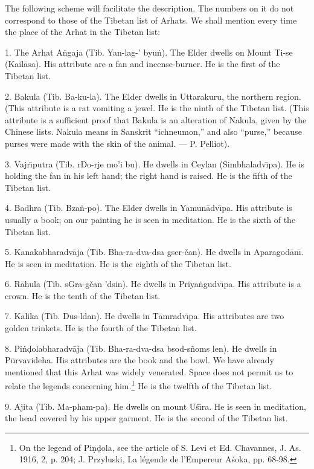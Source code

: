 \documentclass[a4paper, 12pt, oneside]{article}
\begin{document}
The following scheme will facilitate the description. The numbers on it do not correspond to those of the Tibetan list of Arhats. We shall mention every time the place of the Arhat in the Tibetan list:

1. The Arhat A\.{n}gaja (Tib. Yan-lag-' byu\.{n}). The Elder dwells on Mount Ti-se (Kail\={a}sa). His attribute are a fan and incense-burner. He is the first of the Tibetan list.

2. Bakula (Tib. Ba-ku-la). The Elder dwells in Uttarakuru, the northern region. (This attribute is a rat vomiting a jewel. He is the ninth of the Tibetan list. (This attribute is a sufficient proof that Bakula is an alteration of Nakula, given by the Chinese lists. Nakula means in Sanskrit ``ichneumon,'' and also ``purse,'' because purses were made with the skin of the animal. --- P. Pelliot).

3. Vajr\={\i}putra (Tib. rDo-rje mo'i bu). He dwells in Ceylan (Simbhaladv\={\i}pa). He is holding the fan in his left hand; the right hand is raised. He is the fifth of the Tibetan list.

4. Badhra (Tib. Bza\.{n}-po). The Elder dwells in Yamun\={a}dv\={\i}pa. His attribute is usually a book; on our painting he is seen in meditation. He is the sixth of the Tibetan list.

5. Kanakabharadv\={a}ja (Tib. Bha-ra-dva-dsa gser-čan). He dwells in Aparagod\={a}n\={\i}. He is seen in meditation. He is the eighth of the Tibetan list.

6. R\={a}hula (Tib. sGra-gčan 'dsin). He dwells in Priya\.{n}gudv\={\i}pa. His attribute is a crown. He is the tenth of the Tibetan list.

7. K\={a}lika (Tib. Dus-ldan). He dwells in T\={a}mradv\={\i}pa. His attributes are two golden trinkets. He is the fourth of the Tibetan list.

8. Pi\.{n}\d{d}olabharadv\={a}ja (Tib. Bha-ra-dva-dsa bsod-s\~{n}oms len). He dwells in P\={u}rvavideha. His attributes are the book and the bowl. We have already mentioned that this Arhat was widely venerated. Space does not permit us to relate the legends concerning him.\footnote{On the legend of Pi\d{n}\d{d}ola, see the article of S. Levi et Ed. Chavannes, J. As. 1916, 2, p. 204; J. Przyluski, La légende de l'Empereur A\'{s}oka, pp. 68-98.} He is the twelfth of the Tibetan list.

9. Ajita (Tib. Ma-pham-pa). He dwells on mount U\'{s}\={\i}ra. He is seen in meditation, the head covered by his upper garment. He is the second of the Tibetan list.
\end{document}
